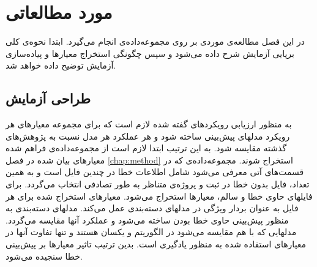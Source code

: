 \chapter{مورد مطالعاتی}
\label{chap:case-study}
در این فصل مطالعه‌ی موردی بر روی مجموعه‌داده‌ی  \cite{Just:2014:DDE:2610384.2628055} انجام می‌گیرد. ابتدا نحوه‌ی کلی برپایی آزمایش شرح داده می‌شود و سپس چگونگی استخراج معیارها و پیاده‌سازی آزمایش توضیح داده خواهد شد. 
\section{طراحی آزمایش}
به منظور ارزیابی رویکردهای گفته شده لازم است که برای مجموعه معیارهای هر رویکرد مدلهای پیش‌بینی ساخته شود و هر عملکرد هر مدل نسبت به پژوهش‌های گذشته مقایسه شود. به این ترتیب ابتدا لازم است از مجموعه‌داده‌ی فراهم شده معیارهای بیان شده در فصل \ref{chap:method} استخراج شوند. مجموعه‌داده‌ی  که در قسمت‌های آتی معرفی می‌شود شامل اطلاعات خطا در چندین فایل است و به همین تعداد، فایل بدون خطا در ثبت و پروژه‌ی متناظر به طور تصادفی انتخاب می‌گردد. برای فایلهای حاوی خطا و سالم، معیارها استخراج می‌شود. معیارهای استخراج شده  برای هر فایل به عنوان بردار ویژگی در مدلهای دسته‌بندی عمل می‌کند. مدلهای دسته‌بندی به منظور پیش‌بینی حاوی خطا بودن ساخته می‌شود و عملکرد آنها مقایسه می‌گردد. مدلهایی که با هم مقایسه می‌شود در الگوریتم و  یکسان هستند و تنها تفاوت آنها در معیارهای استفاده شده به منظور یادگیری است. بدین ترتیب تاثیر معیارها بر پیش‌بینی خطا سنجیده می‌شود. 




